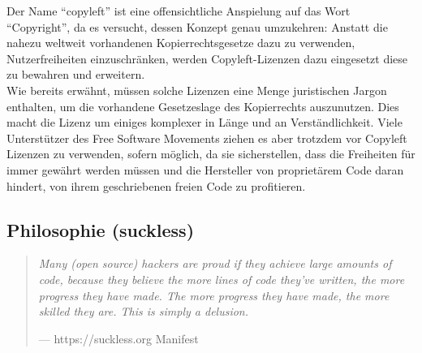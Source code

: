 \documentclass[a4paper,11pt]{article}
\newenvironment{nicequote}[2]{
    \begin{center}\begin{quote}\textit{#1}\\\par\raggedleft--- {#2}
    }{
    \end{quote}\end{center}
}
\begin{document}
Der Name ``copyleft'' ist eine offensichtliche Anspielung auf das Wort ``Copyright'', da es versucht, dessen Konzept genau umzukehren: Anstatt die nahezu weltweit vorhandenen Kopierrechtsgesetze dazu zu verwenden, Nutzerfreiheiten einzuschränken, werden Copyleft-Lizenzen dazu eingesetzt diese zu bewahren und erweitern. \cite{kumar2011}\\

Wie bereits erwähnt, müssen solche Lizenzen eine Menge juristischen Jargon enthalten, um die vorhandene Gesetzeslage des Kopierrechts auszunutzen. Dies macht die Lizenz um einiges komplexer in Länge und an Verständlichkeit. Viele Unterstützer des Free Software Movements ziehen es aber trotzdem vor Copyleft Lizenzen zu verwenden, sofern möglich, da sie sicherstellen, dass die Freiheiten für immer gewährt werden müssen und die Hersteller von proprietärem Code daran hindert, von ihrem geschriebenen freien Code zu profitieren.\\


\subsection{Philosophie (suckless)}

\begin{nicequote}{Many (open source) hackers are proud if they achieve large amounts of code, because they believe the more lines of code they've written, the more progress they have made. The more progress they have made, the more skilled they are. This is simply a delusion.}{https://suckless.org Manifest \cite{suckless}}
\end{nicequote}

\end{document}
